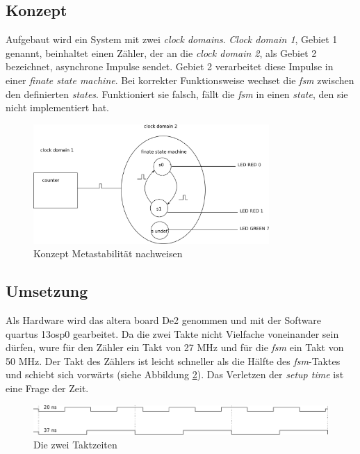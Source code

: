 \subsection{Konzept}\label{sect.metastabil_ansatz}

Aufgebaut wird ein System mit zwei \textit{clock domains}.  \textit{Clock domain 1}, Gebiet 1 genannt,  beinhaltet einen Zähler, der an die \textit{clock domain 2}, als Gebiet 2 bezeichnet, asynchrone Impulse sendet. Gebiet 2 verarbeitet diese Impulse in einer \textit{finate state machine}. Bei korrekter Funktionsweise wechset die \textit{fsm} zwischen den definierten \textit{states}. Funktioniert sie falsch, fällt die \textit{fsm} in einen \textit{state}, den sie nicht implementiert hat.

\begin{figure}[H]
	\includegraphics[width=0.8\textwidth]{images/metastability/konzept.png}
	\caption{Konzept Metastabilität nachweisen}
	\label{fig.metastabil.fsm}
\end{figure}

\subsection{Umsetzung}\label{sect.metastabil_implementation}

Als Hardware wird das altera board De2 genommen und mit der Software quartus 13osp0 gearbeitet. Da die zwei Takte nicht Vielfache voneinander sein dürfen, wure für den Zähler ein Takt von 27 MHz und für die \textit{fsm} ein Takt von 50 MHz. Der Takt des Zählers ist leicht schneller als die Hälfte des \textit{fsm}-Taktes und schiebt sich  vorwärts (siehe Abbildung \ref{fig.metastabil.takte}). Das Verletzen der \textit{setup time} ist eine Frage der Zeit.

\begin{figure}[H]
	\includegraphics[width=1\textwidth]{images/metastability/2_takte.png}
	\caption{Die zwei Taktzeiten}
	\label{fig.metastabil.takte}
\end{figure}

